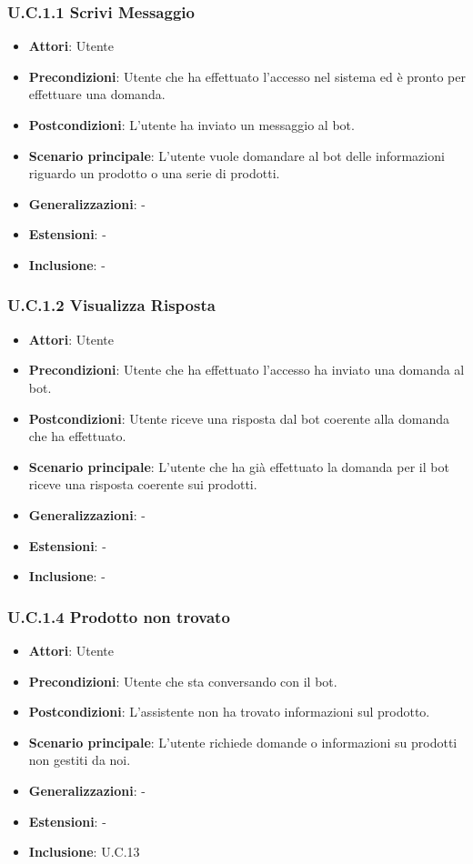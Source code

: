 \subsubsection{U.C.1.1 Scrivi Messaggio}
\begin{itemize}
    \item \textbf{Attori}: Utente
    \item \textbf{Precondizioni}: Utente che ha effettuato l'accesso nel sistema ed è pronto per effettuare una domanda.
    \item \textbf{Postcondizioni}: L'utente ha inviato un messaggio al bot.
    \item \textbf{Scenario principale}: L’utente vuole domandare al bot delle informazioni riguardo un prodotto o una serie di prodotti.
    \item \textbf{Generalizzazioni}: -
    \item \textbf{Estensioni}: -
    \item \textbf{Inclusione}: -
\end{itemize}
\subsubsection{U.C.1.2 Visualizza Risposta}
\begin{itemize}
    \item \textbf{Attori}: Utente
    \item \textbf{Precondizioni}: Utente che ha effettuato l'accesso ha inviato una domanda al bot.
    \item \textbf{Postcondizioni}: Utente riceve una risposta dal bot coerente alla domanda che ha effettuato.
    \item \textbf{Scenario principale}: L'utente che ha già effettuato la domanda per il bot riceve una risposta coerente sui prodotti.
    \item \textbf{Generalizzazioni}: -
    \item \textbf{Estensioni}: -
    \item \textbf{Inclusione}: -
\end{itemize}
\subsubsection{U.C.1.4 Prodotto non trovato}
\begin{itemize}
    \item \textbf{Attori}: Utente
    \item \textbf{Precondizioni}: Utente che sta conversando con il bot.
    \item \textbf{Postcondizioni}: L'assistente non ha trovato informazioni sul prodotto.
    \item \textbf{Scenario principale}: L’utente richiede domande o informazioni su prodotti non gestiti da noi.
    \item \textbf{Generalizzazioni}: -
    \item \textbf{Estensioni}: -
    \item \textbf{Inclusione}: U.C.13
\end{itemize}
